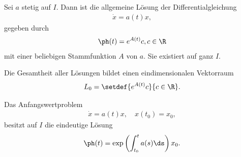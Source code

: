 \begin{prop}
Sei $a$ stetig auf $I$. Dann ist die allgemeine Lösung der
Differentialgleichung
\begin{align*}
\dot{x} = a(t)x,
\end{align*}
gegeben durch
\begin{align*}
\ph(t) = e^{A(t)}c, c \in\R
\end{align*}
mit einer beliebigen Stammfunktion $A$ von $a$. Sie existiert auf ganz $I$.
\end{prop}
\begin{prop}
Die Gesamtheit aller Lösungen bildet einen
eindimensionalen Vektorraum
\begin{align*}
L_0 = \setdef{e^{A(t)}c}{c\in\R}.
\end{align*}
\end{prop}
\begin{prop}
Das Anfangswertproblem 
\begin{align*}
\dot{x} = a(t)x, \quad x(t_0) = x_0,
\end{align*}
besitzt auf $I$ die eindeutige Lösung
\begin{align*}
\ph(t) = \exp\left(\int_{t_0}^t a(s)\ds\right)x_0.
\end{align*}
\end{prop}

